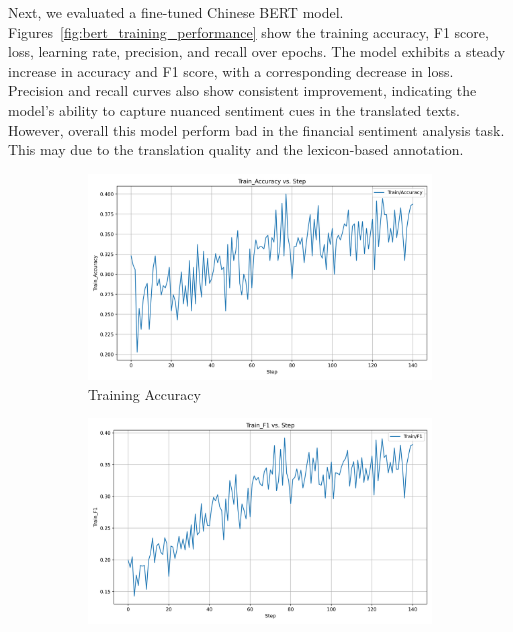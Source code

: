 \documentclass[12pt]{article}
\begin{document}
Next, we evaluated a fine-tuned Chinese BERT model. Figures~\ref{fig:bert_training_performance} show the training accuracy, F1 score, loss, learning rate, precision, and recall over epochs. The model exhibits a steady increase in accuracy and F1 score, with a corresponding decrease in loss. Precision and recall curves also show consistent improvement, indicating the model's ability to capture nuanced sentiment cues in the translated texts. However, overall this model perform bad in the financial sentiment analysis task. This may due to the translation quality and the lexicon-based annotation.

\begin{figure}[H]
	\centering
	\begin{subfigure}[b]{0.32\textwidth}
		\includegraphics[width=\linewidth]{BERT_Train_Accuracy.png}
		\caption{Training Accuracy}
	\end{subfigure}
	\hfill
	\begin{subfigure}[b]{0.32\textwidth}
		\includegraphics[width=\linewidth]{BERT_Train_F1.png}

\end{subfigure}
\end{figure}
\end{document}
